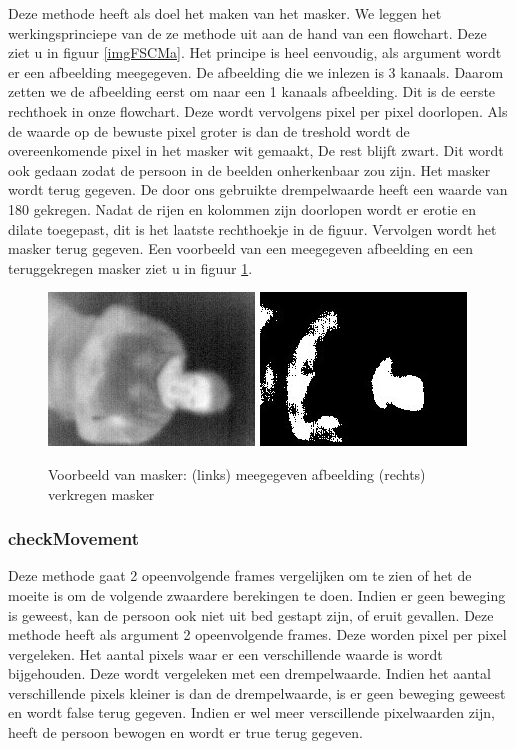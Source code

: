 Deze methode heeft als doel het maken van het masker. We leggen het werkingsprinciepe van de ze methode uit aan de hand van een flowchart. Deze ziet u in figuur \ref{imgFSCMa}. Het principe is heel eenvoudig, als argument wordt er een afbeelding meegegeven. De afbeelding die we inlezen is 3 kanaals. Daarom zetten we de afbeelding eerst om naar een 1 kanaals afbeelding. Dit is de eerste rechthoek in onze flowchart.  Deze wordt vervolgens  pixel per pixel doorlopen. Als de waarde op de bewuste pixel groter is dan de treshold wordt de overeenkomende pixel in het masker wit gemaakt, De rest blijft zwart. Dit wordt ook gedaan zodat de persoon in de beelden onherkenbaar zou zijn. Het masker wordt terug gegeven. De door ons gebruikte drempelwaarde heeft een waarde van 180 gekregen. Nadat de rijen en kolommen zijn doorlopen wordt er erotie en dilate toegepast, dit is het laatste rechthoekje in de figuur. Vervolgen wordt het masker terug gegeven.  Een voorbeeld van een meegegeven afbeelding en een teruggekregen masker ziet u in figuur \ref{imgCMa}.

\begin{figure}[h]
	\includegraphics[scale=0.75]{EersteExperiment_img0}
	\includegraphics[scale = 0.75]{EersteExperiment_mask0}
	\caption{Voorbeeld van masker: (links) meegegeven afbeelding (rechts) verkregen masker}
	\label{imgCMa}
\end{figure}

\subsubsection{checkMovement}
Deze methode gaat 2 opeenvolgende frames vergelijken om te zien of het de moeite is om de volgende zwaardere berekingen te doen. Indien er geen beweging is geweest, kan de persoon ook niet uit bed gestapt zijn, of eruit gevallen. Deze methode heeft als argument 2 opeenvolgende frames. Deze worden pixel per pixel vergeleken. Het aantal pixels waar er een verschillende waarde is wordt bijgehouden. Deze wordt vergeleken met een drempelwaarde. Indien het aantal verschillende pixels kleiner is dan de drempelwaarde, is er geen beweging geweest en wordt false terug gegeven. Indien er wel meer verscillende pixelwaarden zijn, heeft de persoon bewogen en wordt er true terug gegeven.

